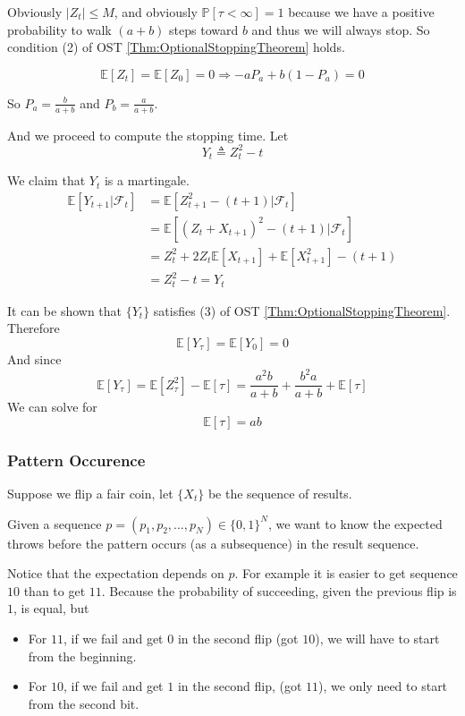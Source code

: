             Obviously $|Z_t| \le M$, and obviously $\mathbb{P}[\tau < \infty]=1$ because we have a positive probability to walk $(a+b)$ steps toward $b$ and thus we will always stop. So condition (2) of OST \ref{Thm:OptionalStoppingTheorem} holds.

            \[ \mathbb{E}[Z_t] = \mathbb{E}[Z_0] = 0 \Rightarrow -aP_a + b(1-P_a) = 0 \]

            So $P_a = \frac{b}{a+b}$ and $P_b = \frac{a}{a+b}$.

            And we proceed to compute the stopping time. Let
            \[ Y_t \triangleq Z_t^2 - t \]

            We claim that $Y_t$ is a martingale.
            \begin{align*}
                \mathbb{E}[Y_{t+1}|\mathcal{F}_t] &= \mathbb{E}[Z_{t+1}^2 - (t+1)|\mathcal{F}_t]\\
                &= \mathbb{E}[(Z_t + X_{t+1})^2 - (t+1) | \mathcal{F}_t]\\
                &= Z_t^2 + 2Z_t\mathbb{E}[X_{t+1}] + \mathbb{E}[X_{t+1}^2] - (t+1)\\
                &= Z_t^2 - t = Y_t
            \end{align*}

            It can be shown that $\{Y_t\}$ satisfies (3) of OST \ref{Thm:OptionalStoppingTheorem}. Therefore
            \[ \mathbb{E}[Y_{\tau}] = \mathbb{E}[Y_0] = 0 \]
            And since
            \[ \mathbb{E}[Y_{\tau}] = \mathbb{E}[Z_{\tau}^2] - \mathbb{E}[\tau] = \frac{a^2b}{a+b} + \frac{b^2a}{a+b} + \mathbb{E}[\tau] \]
            We can solve for
            \[ \mathbb{E}[\tau] = ab \]

        \subsubsection{Pattern Occurence}
            Suppose we flip a fair coin, let $\{X_t\}$ be the sequence of results. 
            
            Given a sequence $p = (p_1,p_2,\dots,p_N) \in \{0,1\}^N$, we want to know the expected throws before the pattern occurs (as a subsequence) in the result sequence.

            Notice that the expectation depends on $p$. For example it is easier to get sequence $10$ than to get $11$. Because the probability of succeeding, given the previous flip is $1$, is equal, but
            \begin{itemize}
                \item For $11$, if we fail and get $0$ in the second flip (got $10$), we will have to start from the beginning.
                \item For $10$, if we fail and get $1$ in the second flip, (got $11$), we only need to start from the second bit.
            \end{itemize}

